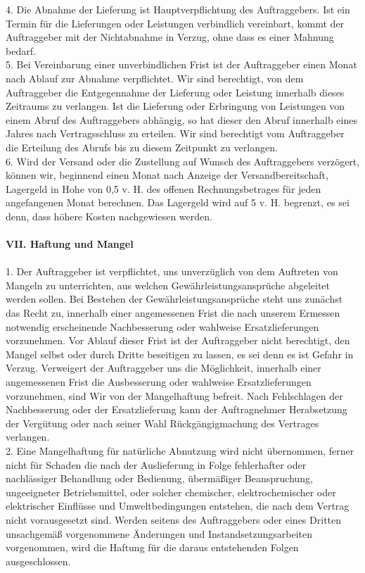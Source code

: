 \documentclass[9pt, oneside]{extletter}
\begin{document}
\begin{multicols}{3}
4. Die Abnahme der Lieferung ist Hauptverpflichtung des Auftraggebers. Ist ein Termin für die Lieferungen oder Leistungen verbindlich vereinbart, kommt der Auftraggeber mit der Nichtabnahme in Verzug, ohne dass es einer Mahnung bedarf.\\
5. Bei Vereinbarung einer unverbindlichen Frist ist der Auftraggeber einen Monat nach Ablauf zur Abnahme verpflichtet. Wir sind berechtigt, von dem Auftraggeber die Entgegennahme der Lieferung oder Leistung innerhalb dieses Zeitraums zu verlangen. Ist die Lieferung oder Erbringung von Leistungen von einem Abruf des Auftraggebers abhängig, so hat dieser den Abruf innerhalb eines Jahres nach Vertragsschluss zu erteilen. Wir sind berechtigt vom Auftraggeber die Erteilung des Abrufs bis zu diesem Zeitpunkt zu verlangen.\\
6. Wird der Versand oder die Zustellung auf Wunsch des Auftraggebers verzögert, können wir, beginnend einen Monat nach Anzeige der Versandbereitschaft, Lagergeld in Hohe von 0,5 v. H. des offenen Rechnungsbetrages für jeden angefangenen Monat berechnen. Das Lagergeld wird auf 5 v. H. begrenzt, es sei denn, dass höhere Kosten nachgewiesen werden.\\
\\
\textbf{VII. Haftung und Mangel}\\
\\
1. Der Auftraggeber ist verpflichtet, uns unverzüglich von dem Auftreten von Mangeln zu unterrichten, aus welchen Gewährleistungsansprüche abgeleitet werden sollen. Bei Bestehen der Gewährleistungsansprüche steht uns zunächst das Recht zu, innerhalb einer angemessenen Frist die nach unserem Ermessen notwendig erscheinende Nachbesserung oder wahlweise Ersatzlieferungen vorzunehmen. Vor Ablauf dieser Frist ist der Auftraggeber nicht berechtigt, den Mangel selbst oder durch Dritte beseitigen zu lassen, es sei denn es ist Gefahr in Verzug. Verweigert der Auftraggeber uns die Möglichkeit, innerhalb einer angemessenen Frist die Ausbesserung oder wahlweise Ersatzlieferungen vorzunehmen, sind Wir von der Mangelhaftung befreit. Nach Fehlschlagen der Nachbesserung oder der Ersatzlieferung kann der Auftragnehmer Herabsetzung der Vergütung oder nach seiner Wahl Rückgängigmachung des Vertrages verlangen.\\
2. Eine Mangelhaftung für natürliche Abnutzung wird nicht übernommen, ferner nicht für Schaden die nach der Auslieferung in Folge fehlerhafter oder nachlässiger Behandlung oder Bedienung, übermäßiger Beanspruchung, ungeeigneter Betriebsmittel, oder solcher chemischer, elektrochemischer oder elektrischer Einflüsse und Umweltbedingungen entstehen, die nach dem Vertrag nicht vorausgesetzt sind. Werden seitens des Auftraggebers oder eines Dritten unsachgemäß vorgenommene Änderungen und Instandsetzungsarbeiten vorgenommen, wird die Haftung für die daraus entstehenden Folgen ausgeschlossen.\\

\end{multicols}
\end{document}
